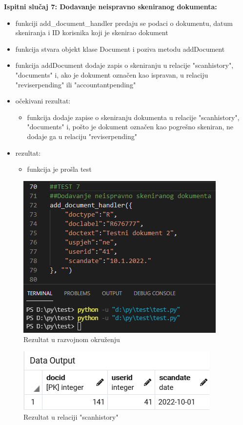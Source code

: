 		\textbf{Ispitni slučaj 7: Dodavanje neispravno skeniranog dokumenta:}\\
\begin{itemize}
	\item funkciji add\_document\_handler predaju se podaci o dokumentu, datum skeniranja i ID korisnika koji je skenirao dokument
	\item funkcija stvara objekt klase Document i poziva metodu addDocument
	\item funkcija addDocument dodaje zapis o skeniranju u relacije "scanhistory", "documents" i, ako je dokument označen kao ispravan, u relaciju "reviserpending" ili "accountantpending" 
	
	\item očekivani rezultat:\\
	\begin{itemize}
		\item funkcija dodaje zapise o skeniranju dokumenta u relacije "scanhistory", "documents" i, pošto je dokument označen kao pogrešno skeniran, ne dodaje ga u relaciju "reviserpending"
	\end{itemize}
	\item rezultat:
	\begin{itemize}
		\item funkcija je prošla test
	\end{itemize}
\end{itemize}
\begin{figure}[H]
	\centering
	\includegraphics[scale=0.5]{./slike/rez7.png}
	\caption{Rezultat u razvojnom okruženju}
	\label{fig:REZ7}
\end{figure}
\begin{figure}[H]
	\centering
	\includegraphics[scale=0.5]{./slike/baza7sh.png}
	\caption{Rezultat u relaciji "scanhistory"}
	\label{fig:BAZA7a}
\end{figure}
